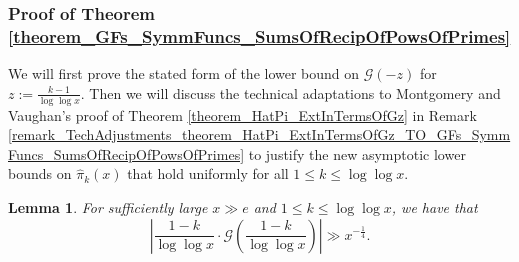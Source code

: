 \documentclass[11pt,reqno,a4letter]{article}
\numberwithin{figure}{section}
\numberwithin{table}{section}
\theoremstyle{plain}
\newtheorem{lemma}[theorem]{Lemma}
\numberwithin{theorem}{section}
\theoremstyle{definition}
\newcommand{\NBRef}[1]{}
\begin{document}
\subsubsection{Proof of Theorem \ref{theorem_GFs_SymmFuncs_SumsOfRecipOfPowsOfPrimes}} 

We will first prove the stated form of the lower bound on 
$\mathcal{G}(-z)$ for $z := \frac{k-1}{\log\log x}$. 
Then we will discuss the technical adaptations to Montgomery and Vaughan's proof of 
Theorem \ref{theorem_HatPi_ExtInTermsOfGz} in 
Remark \ref{remark_TechAdjustments_theorem_HatPi_ExtInTermsOfGz_TO_GFs_SymmFuncs_SumsOfRecipOfPowsOfPrimes} 
to justify the new asymptotic lower bounds on $\widehat{\pi}_k(x)$ that hold uniformly for all 
$1 \leq k \leq \log\log x$. 

\NBRef{A06-2020-04-26} 
\begin{lemma} 
\label{lemma_theorem_HatPi_ExtInTermsOfGz} 
For sufficiently large $x \gg e$ and $1 \leq k \leq \log\log x$, we have that 
\[
\left\lvert \frac{1-k}{\log\log x} \cdot 
     \mathcal{G}\left(\frac{1-k}{\log\log x}\right) \right\rvert 
     \gg x^{-\frac{1}{4}}. 
\]
\end{lemma} 
\end{document}
